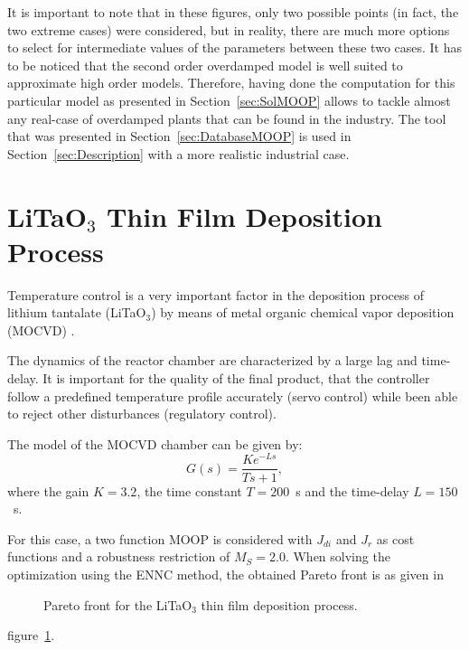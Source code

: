 It is important to note that in these figures, only two possible points (in fact, the two extreme cases) were considered, but in reality, there are much more options to select for intermediate values of the parameters between these two cases. It has to be noticed that the second order overdamped model is well suited to approximate high order models. Therefore, having done the computation for this particular model as presented in Section~\ref{sec:SolMOOP} allows to tackle almost any real-case of overdamped plants that can be found in the industry. The tool that was presented in Section~\ref{sec:DatabaseMOOP} is used in Section~\ref{sec:Description} with a more realistic industrial case.
\section{LiTaO$_3$ Thin Film Deposition Process}
\label{sec:LiTAO3}
Temperature control is a very important factor in the deposition process of lithium tantalate (LiTaO$_3$) by means of metal organic chemical vapor deposition (MOCVD) \citep{Zhang2004}.

The dynamics of the reactor chamber are characterized by a large lag and time-delay. It is important for the quality of the final product, that the controller follow a predefined temperature profile accurately (servo control) while been able to reject other disturbances (regulatory control).

The model of the MOCVD chamber can be given by:
\begin{equation}
G(s) = \frac{K e^{-L s}}{T s+1},
\label{eq:GsLita}
\end{equation}
%
where the gain $K = 3.2$, the time constant $T = 200$~s and the time-delay $L = 150$~s.

For this case, a two function MOOP is considered with $J_{di}$ and $J_{r}$ as cost functions and a robustness restriction of $M_S = 2.0$. When solving the optimization using the ENNC method, the obtained Pareto front is as given in %
\begin{figure}[tb]
	\centering
	\caption{Pareto front for the LiTaO$_3$ thin film deposition process.}
	\label{fig:LitaPareto}
\end{figure}
%
figure~\ref{fig:LitaPareto}.

